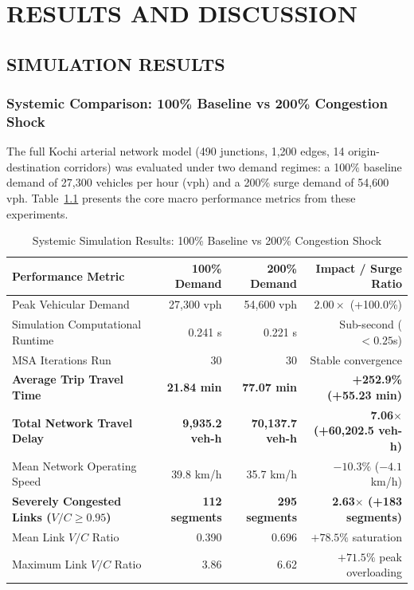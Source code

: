 \documentclass[12pt,a4paper]{report}
\begin{document}
\chapter{RESULTS AND DISCUSSION}
\label{chap:results}

\section{SIMULATION RESULTS}

\subsection*{Systemic Comparison: 100\% Baseline vs 200\% Congestion Shock}
The full Kochi arterial network model (490 junctions, 1,200 edges, 14 origin-destination corridors) was evaluated under two demand regimes: a 100\% baseline demand of 27,300 vehicles per hour (vph) and a 200\% surge demand of 54,600 vph. Table~\ref{tab:comparison_summary} presents the core macro performance metrics from these experiments.

\begin{table}[H]
\centering
\caption{Systemic Simulation Results: 100\% Baseline vs 200\% Congestion Shock}
\label{tab:comparison_summary}
\vspace{0.15cm}
\small
\begin{tabularx}{\textwidth}{Xrrr}
\toprule
\textbf{Performance Metric} & \textbf{100\% Demand} & \textbf{200\% Demand} & \textbf{Impact / Surge Ratio} \\
\midrule
Peak Vehicular Demand & 27,300 vph & 54,600 vph & $2.00\times$ (+100.0\%) \\
Simulation Computational Runtime & 0.241 s & 0.221 s & Sub-second ($< 0.25$s) \\
MSA Iterations Run & 30 & 30 & Stable convergence \\
\textbf{Average Trip Travel Time} & \textbf{21.84 min} & \textbf{77.07 min} & \textbf{+252.9\% (+55.23 min)} \\
\textbf{Total Network Travel Delay} & \textbf{9,935.2 veh-h} & \textbf{70,137.7 veh-h} & \textbf{7.06$\times$ (+60,202.5 veh-h)} \\
Mean Network Operating Speed & 39.8 km/h & 35.7 km/h & $-10.3\%$ ($-4.1$ km/h) \\
\textbf{Severely Congested Links ($V/C \ge 0.95$)} & \textbf{112 segments} & \textbf{295 segments} & \textbf{2.63$\times$ (+183 segments)} \\
Mean Link $V/C$ Ratio & 0.390 & 0.696 & $+78.5\%$ saturation \\
Maximum Link $V/C$ Ratio & 3.86 & 6.62 & $+71.5\%$ peak overloading \\
\bottomrule
\end{tabularx}
\end{table}
\end{document}
